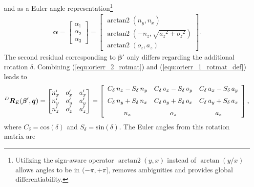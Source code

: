 \documentclass[robotics,article,accept,moreauthors,pdftex]{Definitions/mdpi}
\newcommand{\bm}[1]{\boldsymbol{#1}}
\DeclareMathOperator{\arctantwo}{arctan2}
\newcommand{\rotmat}[2]{{{ }^{#1}\boldsymbol{R}}_{#2}}
\begin{document}
%
and as a Euler angle representation\footnote{Utilizing the sign-aware operator $\arctantwo(y,x)$ instead of $\arctan(y/x)$ allows angles to be in $(-\pi,+\pi]$, removes ambiguities and provides global differentiability.}
%
\begin{align}
    \bm{\alpha}
    =
    \begin{bmatrix}
    \alpha_1 \\
    \alpha_2 \\
    \alpha_3
    \end{bmatrix}
    =
    \begin{bmatrix}
        \arctantwo \left( {n_y} , { n_x} \right) \\ 
        \arctantwo \left( -{n_z} , \sqrt {{{a_z}}^{2}+{{ o_z}}^{2}} \right) \\ 
        \arctantwo \left( {o_z} , {a_z} \right)
    \end{bmatrix}.
    \label{equ:alpha_zyx}
\end{align}
%
The second residual corresponding to $\bm{\beta}'$ only differs regarding the additional rotation $\delta$. Combining (\ref{equ:orierr_2_rotmat}) and (\ref{equ:orierr_1_rotmat_def}) leads to
%
\begin{align}
    \rotmat{D}{E}(\bm{\beta}',\bm{q})
    =
    \begin{bmatrix}
    {n'_x}&{o'_x}&{a'_x} \\
    {n'_y}&{o'_y}&{a'_y} \\ 
    {n'_z}&{o'_z}&{a'_z} \\ 
    \end{bmatrix}
    = 
    \left[ \begin {array}{ccc} { C_{\delta}}\,{n_x}-{ S_{\delta}}\,{ n_y}&{ C_{\delta}}\,{o_x}-{ S_{\delta}}\,{o_y}&{ C_{\delta}}\,{ a_x}-{ S_{\delta}}\,{a_y}\\ \noalign{\medskip}{ C_{\delta}}\,{n_y}+ { S_{\delta}}\,{n_x}&{ C_{\delta}}\,{o_y}+{ S_{\delta}}\,{o_x}&{ C_{\delta}}\,{a_y}+{ S_{\delta}}\,{a_x}\\ \noalign{\medskip}{ n_z}&{o_z}&{a_z}\end {array} \right], \nonumber
\end{align}
%
where $C_{\delta}=\mathrm{cos}(\delta)$ and $S_{\delta}=\mathrm{sin}(\delta)$.
The Euler angles from this rotation matrix are
\end{document}

